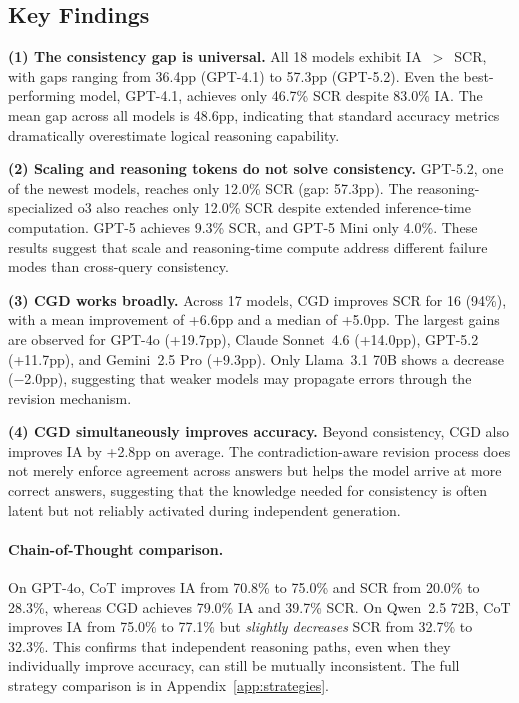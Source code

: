 \documentclass{article}
\newcommand{\method}{\textsc{CGD}}
\begin{document}
\subsection{Key Findings}

\textbf{(1) The consistency gap is universal.} All 18 models exhibit IA~$>$~SCR, with gaps ranging from 36.4pp (GPT-4.1) to 57.3pp (GPT-5.2). Even the best-performing model, GPT-4.1, achieves only 46.7\% SCR despite 83.0\% IA. The mean gap across all models is 48.6pp, indicating that standard accuracy metrics dramatically overestimate logical reasoning capability.

\textbf{(2) Scaling and reasoning tokens do not solve consistency.} GPT-5.2, one of the newest models, reaches only 12.0\% SCR (gap: 57.3pp). The reasoning-specialized o3 also reaches only 12.0\% SCR despite extended inference-time computation. GPT-5 achieves 9.3\% SCR, and GPT-5 Mini only 4.0\%. These results suggest that scale and reasoning-time compute address different failure modes than cross-query consistency.

\textbf{(3) \method{} works broadly.} Across 17 models, \method{} improves SCR for 16 (94\%), with a mean improvement of +6.6pp and a median of +5.0pp. The largest gains are observed for GPT-4o (+19.7pp), Claude Sonnet~4.6 (+14.0pp), GPT-5.2 (+11.7pp), and Gemini~2.5 Pro (+9.3pp). Only Llama~3.1 70B shows a decrease ($-$2.0pp), suggesting that weaker models may propagate errors through the revision mechanism.

\textbf{(4) \method{} simultaneously improves accuracy.} Beyond consistency, \method{} also improves IA by +2.8pp on average. The contradiction-aware revision process does not merely enforce agreement across answers but helps the model arrive at more correct answers, suggesting that the knowledge needed for consistency is often latent but not reliably activated during independent generation.

\paragraph{Chain-of-Thought comparison.} On GPT-4o, CoT improves IA from 70.8\% to 75.0\% and SCR from 20.0\% to 28.3\%, whereas \method{} achieves 79.0\% IA and 39.7\% SCR. On Qwen~2.5 72B, CoT improves IA from 75.0\% to 77.1\% but \emph{slightly decreases} SCR from 32.7\% to 32.3\%. This confirms that independent reasoning paths, even when they individually improve accuracy, can still be mutually inconsistent. The full strategy comparison is in Appendix~\ref{app:strategies}.
\end{document}
